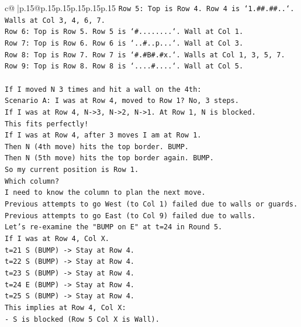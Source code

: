 \documentclass{article}
\begin{document}
{\begin{supertabular}{c@{$\;$}|p{.15\linewidth}@{}p{.15\linewidth}p{.15\linewidth}p{.15\linewidth}p{.15\linewidth}p{.15\linewidth}}
{{{\texttt{Row 5: Top is Row 4. Row 4 is `1.\#\#.\#\#..`. Walls at Col 3, 4, 6, 7.} \\
\texttt{Row 6: Top is Row 5. Row 5 is `\#........`. Wall at Col 1.} \\
\texttt{Row 7: Top is Row 6. Row 6 is `..\#..p...`. Wall at Col 3.} \\
\texttt{Row 8: Top is Row 7. Row 7 is `\#.\#B\#.\#x.`. Walls at Col 1, 3, 5, 7.} \\
\texttt{Row 9: Top is Row 8. Row 8 is `....\#....`. Wall at Col 5.} \\
\\ 
\texttt{If I moved N 3 times and hit a wall on the 4th:} \\
\texttt{Scenario A: I was at Row 4, moved to Row 1? No, 3 steps.} \\
\texttt{If I was at Row 4, N{-}>3, N{-}>2, N{-}>1. At Row 1, N is blocked.} \\
\texttt{This fits perfectly!} \\
\texttt{If I was at Row 4, after 3 moves I am at Row 1.} \\
\texttt{Then N (4th move) hits the top border. BUMP.} \\
\texttt{Then N (5th move) hits the top border again. BUMP.} \\
\texttt{So my current position is Row 1.} \\
\texttt{Which column?} \\
\texttt{I need to know the column to plan the next move.} \\
\texttt{Previous attempts to go West (to Col 1) failed due to walls or guards.} \\
\texttt{Previous attempts to go East (to Col 9) failed due to walls.} \\
\texttt{Let's re{-}examine the "BUMP on E" at t=24 in Round 5.} \\
\texttt{If I was at Row 4, Col X.} \\
\texttt{t=21 S (BUMP) {-}> Stay at Row 4.} \\
\texttt{t=22 S (BUMP) {-}> Stay at Row 4.} \\
\texttt{t=23 S (BUMP) {-}> Stay at Row 4.} \\
\texttt{t=24 E (BUMP) {-}> Stay at Row 4.} \\
\texttt{t=25 S (BUMP) {-}> Stay at Row 4.} \\
\texttt{This implies at Row 4, Col X:} \\
\texttt{{-} S is blocked (Row 5 Col X is Wall).} \\
}}}
\end{supertabular}}
\end{document}
